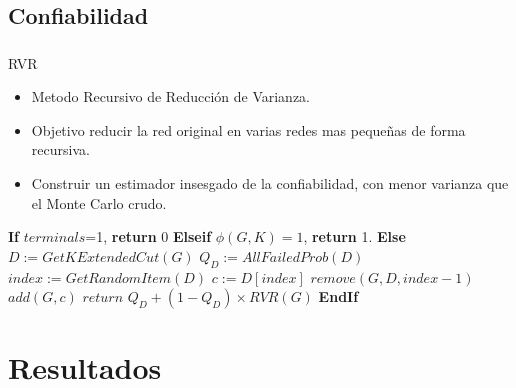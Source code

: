 \subsection{Confiabilidad}
\begin{frame}\frametitle{}
\begin{block}{RVR}
\begin{scriptsize}
\begin{itemize}
 \item Metodo Recursivo de Reducción de Varianza.
 \item Objetivo reducir la red original en varias redes mas pequeñas de forma recursiva.
 \item Construir un estimador insesgado de la confiabilidad, con menor varianza que el Monte Carlo crudo.
\end{itemize} 
\end{scriptsize}
\end{block}
\begin{block}{}
\begin{algorithm}[H]
\caption{$RVR(G,K,p_v,p_e)$}
\begin{algorithmic}[1]
\begin{tiny}
\STATE \textbf{If} $terminals$=1, \textbf{return} $0$
\STATE \textbf{Elseif} $\phi(G,K)=1$, \textbf{return} 1.
\STATE \textbf{Else} 
\STATE $D := GetKExtendedCut(G)$
\STATE $Q_{D} := AllFailedProb(D)$
\STATE $index := GetRandomItem(D)$
\STATE $c := D[index]$
\STATE $remove(G,D, index - 1)$
\STATE $add(G, c)$
\STATE $return \, \, Q_{D} + (1 - Q_{D})\times RVR(G)$
\STATE \textbf{EndIf}
\end{tiny}
\end{algorithmic}
\end{algorithm}
\end{block}
\end{frame}

\section{Resultados}
